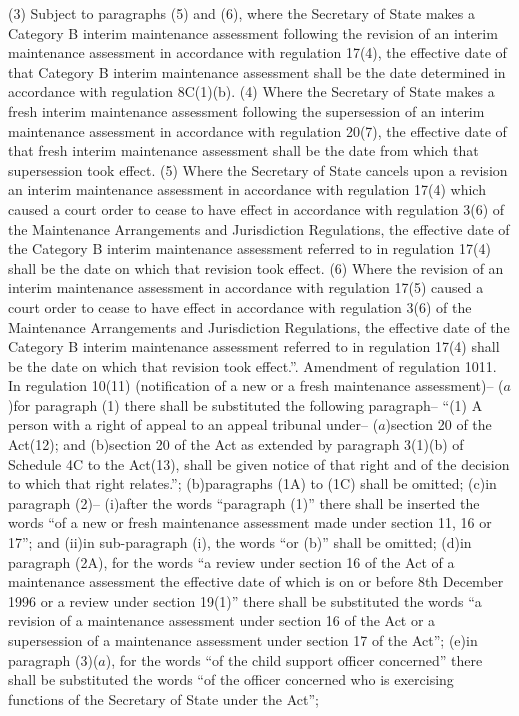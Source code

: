 \documentclass[12pt,a4paper]{article}
\begin{document}
(3) Subject to paragraphs (5) and (6), where the Secretary of State makes a Category B interim maintenance assessment following the revision of an interim maintenance assessment in accordance with regulation 17(4), the effective date of that Category B interim maintenance assessment shall be the date determined in accordance with regulation 8C(1)(b).
(4) Where the Secretary of State makes a fresh interim maintenance assessment following the supersession of an interim maintenance assessment in accordance with regulation 20(7), the effective date of that fresh interim maintenance assessment shall be the date from which that supersession took effect.
(5) Where the Secretary of State cancels upon a revision an interim maintenance assessment in accordance with regulation 17(4) which caused a court order to cease to have effect in accordance with regulation 3(6) of the Maintenance Arrangements and Jurisdiction Regulations, the effective date of the Category B interim maintenance assessment referred to in regulation 17(4) shall be the date on which that revision took effect.
(6) Where the revision of an interim maintenance assessment in accordance with regulation 17(5) caused a court order to cease to have effect in accordance with regulation 3(6) of the Maintenance Arrangements and Jurisdiction Regulations, the effective date of the Category B interim maintenance assessment referred to in regulation 17(4) shall be the date on which that revision took effect.”.
Amendment of regulation 1011.  In regulation 10(11) (notification of a new or a fresh maintenance assessment)–
($a$)for paragraph (1) there shall be substituted the following paragraph–
“(1) A person with a right of appeal to an appeal tribunal under–
($a$)section 20 of the Act(12); and
(b)section 20 of the Act as extended by paragraph 3(1)(b) of Schedule 4C to the Act(13),
shall be given notice of that right and of the decision to which that right relates.”;
(b)paragraphs (1A) to (1C) shall be omitted;
(c)in paragraph (2)–
(i)after the words “paragraph (1)” there shall be inserted the words “of a new or fresh maintenance assessment made under section 11, 16 or 17”; and
(ii)in sub-paragraph (i), the words “or (b)” shall be omitted;
(d)in paragraph (2A), for the words “a review under section 16 of the Act of a maintenance assessment the effective date of which is on or before 8th December 1996 or a review under section 19(1)” there shall be substituted the words “a revision of a maintenance assessment under section 16 of the Act or a supersession of a maintenance assessment under section 17 of the Act”;
(e)in paragraph (3)($a$), for the words “of the child support officer concerned” there shall be substituted the words “of the officer concerned who is exercising functions of the Secretary of State under the Act”;
\end{document}
